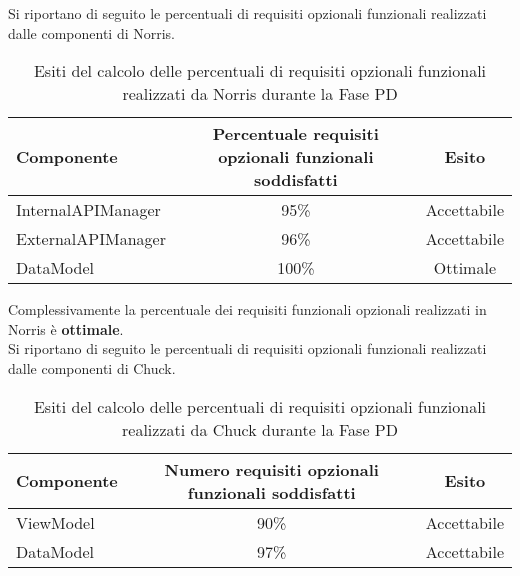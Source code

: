 				Si riportano di seguito le percentuali di requisiti opzionali funzionali realizzati dalle componenti di Norris.
				\begin{table}[H]
					\centering
						\begin{tabu}{| l | c | c |}
							\hline
							Componente	& Percentuale requisiti opzionali funzionali soddisfatti	& Esito		\\ \hline \hline
							InternalAPIManager	& 95\% 	& Accettabile  \\ \hline
							ExternalAPIManager  & 	96\%	& Accettabile  \\ \hline
							DataModel  & 	100\%	& Ottimale  \\ \hline
						\end{tabu}
					\caption{Esiti del calcolo delle percentuali di requisiti opzionali funzionali realizzati da Norris durante la Fase PD}
				\end{table}
				Complessivamente la percentuale dei requisiti funzionali opzionali realizzati in Norris è \textbf{ottimale}.\\				
				Si riportano di seguito le percentuali di requisiti opzionali funzionali realizzati dalle componenti di Chuck.
				\begin{table}[H]
					\centering
						\begin{tabu}{| l | c | c |}
							\hline
							Componente	& Numero requisiti opzionali funzionali soddisfatti	& Esito		\\ \hline \hline
							ViewModel  	& 90\%	& Accettabile  \\ \hline
							DataModel  	& 	97\%	& Accettabile  \\ \hline
						\end{tabu}
					\caption{Esiti del calcolo delle percentuali di requisiti opzionali funzionali realizzati da Chuck durante la Fase PD}
				\end{table}

